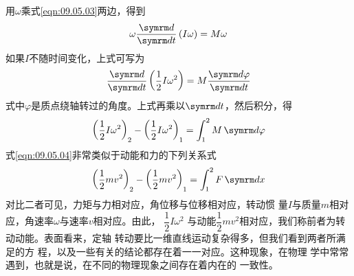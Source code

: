 用$ \omega $乘式\eqref{eqn:09.05.03}两边，得到
\begin{equation*}
  \omega \frac { \dif } { \dif t } \left( I \omega \right) = M \omega
\end{equation*}
如果$ I $不随时间变化，上式可写为
\begin{equation*}
  \frac { \dif } { \dif t } \left( \frac { 1 } { 2 } I \omega ^ { 2 } \right) = M \frac { \dif \varphi } { \dif t }
\end{equation*}
式中$ \varphi $是质点绕轴转过的角度。上式再乘以$ \dif t $，然后积分，得
\begin{equation}\label{eqn:09.05.04}
  { \left( \frac { 1 } { 2 } I \omega ^ { 2 } \right) } _ { 2 } - { \left( \frac { 1 } { 2 } I \omega ^ { 2 } \right) } _ { 1 } = \int _ 1 ^ { 2 } M \dif \varphi
\end{equation}
式\eqref{eqn:09.05.04}非常类似于动能和力的下列关系式
\begin{equation*}
  { \left( \frac { 1 } { 2 } m v ^ { 2 } \right) } _ { 2 } - { \left( \frac { 1 } { 2 } m v ^ { 2 } \right) } _ { 1 } = \int _ { 1 } ^ { 2 } F \dif x
\end{equation*}
对比二者可见，力矩与力相对应，角位移与位移相对应，转动惯
量$ I $与质量$ m $相对应，角速率$ \omega $与速率$ v $相对应。由此，
$ \dfrac { 1 } { 2 } I \omega ^ { 2 } $
与动能$ \dfrac { 1 } { 2 } m v ^ { 2 } $相对应，我们称前者为转动动能。表面看来，定轴
转动要比一维直线运动复杂得多，但我们看到两者所满足的方
程，以及一些有关的结论都存在着一一对应。这种现象，在物理
学中常常遇到，也就是说，在不同的物理现象之间存在着内在的
一致性。
